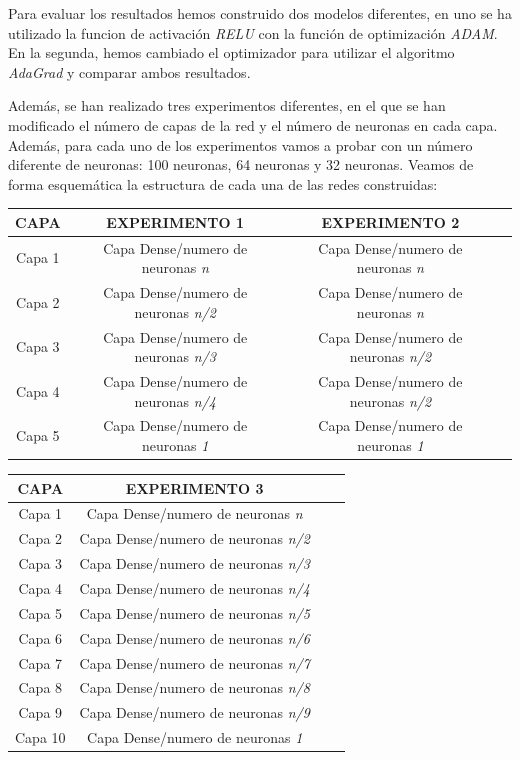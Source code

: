 \documentclass[11pt]{article} %
\begin{document}
Para evaluar los resultados hemos construido dos modelos diferentes, en uno se ha utilizado la funcion de activación \textit{RELU} con la función de optimización \textit{ADAM}. En la segunda, hemos cambiado el optimizador para utilizar el algoritmo \textit{AdaGrad} y comparar ambos resultados.

Además, se han realizado tres experimentos diferentes, en el que se han modificado el número de capas de la red y el número de neuronas en cada capa. Además, para cada uno de los experimentos vamos a probar con un número diferente de neuronas: 100 neuronas, 64 neuronas y 32 neuronas. Veamos de forma esquemática la estructura de cada una de las redes construidas:

\vspace{2ex}

\begin{tabular}{| c | c | c | c | }
	\hline
	\textbf{CAPA} & \textbf{EXPERIMENTO 1} & \textbf{EXPERIMENTO 2} \\ \hline 
	Capa 1 & Capa Dense/numero de neuronas \textit{n}  & Capa Dense/numero de neuronas \textit{n}   \\ \hline 
	Capa 2 & Capa Dense/numero de neuronas \textit{n/2}  &  Capa Dense/numero de neuronas \textit{n}  \\ \hline 
	Capa 3 & Capa Dense/numero de neuronas \textit{n/3}  & Capa Dense/numero de neuronas \textit{n/2}   \\ \hline 
	Capa 4 & Capa Dense/numero de neuronas \textit{n/4}  &  Capa Dense/numero de neuronas \textit{n/2}  \\ \hline 	
	Capa 5 & Capa Dense/numero de neuronas \textit{1} &  Capa Dense/numero de neuronas \textit{1}  \\ \hline 
\end{tabular}

\vspace{2ex}

\begin{tabular}{| c | c | c | c | }
	\hline
	\centering
	\textbf{CAPA} & \textbf{EXPERIMENTO 3}  \\ \hline 
	Capa 1 & Capa Dense/numero de neuronas \textit{n}    \\ \hline 
	Capa 2 & Capa Dense/numero de neuronas \textit{n/2}    \\ \hline 
	Capa 3 & Capa Dense/numero de neuronas \textit{n/3}   \\ \hline 
	Capa 4 & Capa Dense/numero de neuronas \textit{n/4}   \\ \hline 	
	Capa 5 & Capa Dense/numero de neuronas \textit{n/5}   \\ \hline 
	Capa 6 & Capa Dense/numero de neuronas \textit{n/6}  \\ \hline 
	Capa 7 & Capa Dense/numero de neuronas \textit{n/7}   \\ \hline 
	Capa 8 & Capa Dense/numero de neuronas \textit{n/8}   \\ \hline 	
	Capa 9 &  Capa Dense/numero de neuronas \textit{n/9}  \\ \hline 
	Capa 10 &  Capa Dense/numero de neuronas \textit{1}  \\ \hline 
\end{tabular}
\end{document}
